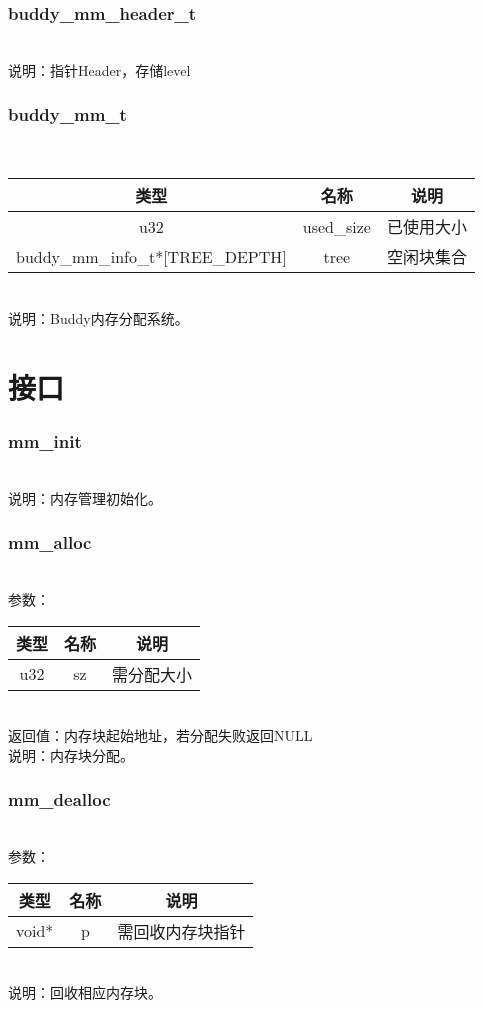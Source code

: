 \subsubsection{buddy\_mm\_header\_t}
\\
说明：指针Header，存储level

\subsubsection{buddy\_mm\_t}
\\
\begin{tabular}{|c|c|c|}
    \hline
    类型 & 名称 & 说明\\\hline
    u32 & used\_size & 已使用大小\\\hline
    buddy\_mm\_info\_t*[TREE\_DEPTH] & tree & 空闲块集合\\\hline
\end{tabular}\\
说明：Buddy内存分配系统。

\section{接口}

\subsubsection{mm\_init}
\\
说明：内存管理初始化。

\subsubsection{mm\_alloc}
\\
参数：\\
\begin{tabular}{|c|c|c|}
    \hline
    类型 & 名称 & 说明\\\hline
    u32 & sz & 需分配大小\\\hline
\end{tabular}\\
返回值：内存块起始地址，若分配失败返回NULL\\
说明：内存块分配。

\subsubsection{mm\_dealloc}
\\
参数：\\
\begin{tabular}{|c|c|c|}
    \hline
    类型 & 名称 & 说明\\\hline
    void* & p & 需回收内存块指针\\\hline
\end{tabular}\\
说明：回收相应内存块。